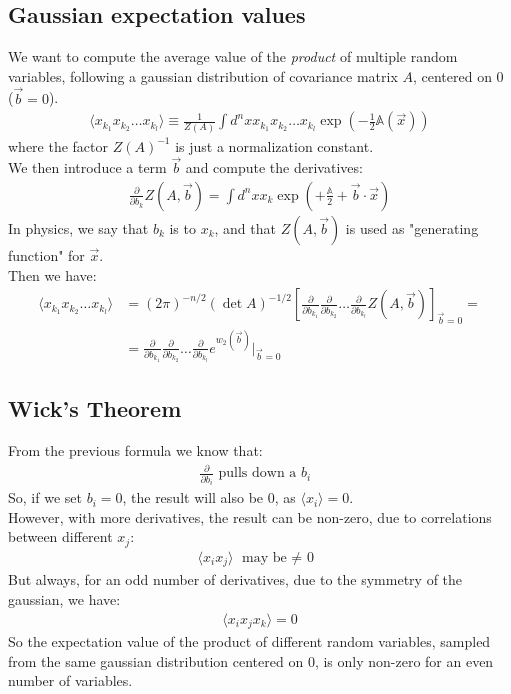 \documentclass[../template.tex]{subfiles}
\begin{document}
\subsection{Gaussian expectation values}
We want to compute the average value of the \textit{product} of multiple random variables, following a gaussian distribution of covariance matrix $A$, centered on $0$ ($\vec{b} = 0$).   
\begin{align*}
    \langle x_{k_1} x_{k_2} \dots x_{k_l} \rangle \equiv \frac{1}{Z(A)} \int d^n x x_{k_1} x_{k_2} \dots x_{k_l} \exp\left(-\frac{1}{2} \mathbb{A}(\vec{x}) \right) 
\end{align*}
where the factor $Z(A)^{-1}$ is just a normalization constant.\\
We then introduce a term $\vec{b}$ and compute the derivatives:
\begin{align*}
    \frac{\partial}{\partial b_k} Z(A,\vec{b}) = \int d^n x x_k \exp\left(+\frac{\mathbb{A}}{2} + \vec{b}\cdot \vec{x} \right) 
\end{align*} 
In physics, we say that $b_k$ is  to $x_k$, and that $Z(A,\vec{b})$ is used as "generating function" for $\vec{x}$.\\
Then we have:
\begin{align*}
    \langle x_{k_1} x_{k_2 }\dots x_{k_l} \rangle &= (2\pi)^{-n/2}(\operatorname{det}A )^{-1/2} \left[\frac{\partial}{\partial b_{k_1 }} \frac{\partial}{\partial b_{k_2 }} \dots \frac{\partial}{\partial b_{k_l}} Z(A,\vec{b})   \right]_{\vec{b}=0} =\\
    &= \frac{\partial}{\partial b_{k_1 }} \frac{\partial}{\partial b_{k_2 }} \dots \frac{\partial}{\partial b_{k_l}} e^{w_2(\vec{b})} \Big|_{\vec{b}=0}
\end{align*}    

\subsection{Wick's Theorem}
From the previous formula we know that:
\begin{align*}
    \frac{\partial}{\partial b_i} \text{ pulls down a $b_i$ } 
\end{align*}
So, if we set $b_i = 0$, the result will also be $0$, as $\langle x_i \rangle = 0$.\\
However, with more derivatives, the result can be non-zero, due to correlations between different $x_j$:
\begin{align*}
    \langle x_i x_j \rangle \text{ may be $\neq$ 0 }
\end{align*}    
But always, for an odd number of derivatives, due to the symmetry of the gaussian, we have:
\begin{align*}
    \langle x_i x_j x_k \rangle = 0
\end{align*}
So the expectation value of the product of different random variables, sampled from the same gaussian distribution centered on $0$, is only non-zero for an even number of variables. \\
\end{document}
